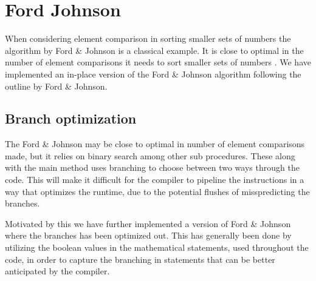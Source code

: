 \section{Ford Johnson}
When considering element comparison in sorting smaller sets of numbers the algorithm by Ford \& Johnson is a classical example\cite{fj59}. It is close to optimal in the number of element comparisons it needs to sort smaller sets of numbers \cite{m77}. We have implemented an in-place version of the Ford \& Johnson algorithm following the outline by Ford \& Johnson\cite{fj59}.

\subsection{Branch optimization}
The Ford \& Johnson may be close to optimal in number of element comparisons made, but it relies on binary search among other sub procedures. These along with the main method uses branching to choose between two ways through the code. This will make it difficult for the compiler to pipeline the instructions in a way that optimizes the runtime, due to the potential flushes of misspredicting the branches.

Motivated by this we have further implemented a version of Ford \& Johnson where the branches has been optimized out. This has generally been done by utilizing the boolean values in the mathematical statements, used throughout the code, in order to capture the branching in statements that can be better anticipated by the compiler.